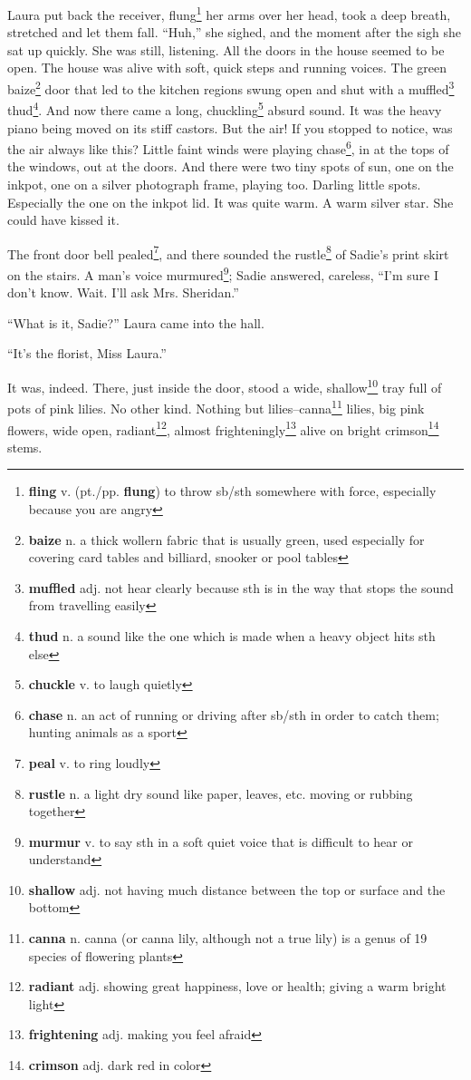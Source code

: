 Laura put back the receiver, flung\footnote{\textbf{fling} v. (pt./pp. \textbf{flung}) to throw sb/sth somewhere with force, especially because you are angry} her arms over her head, took a deep breath, stretched and let them fall. ``Huh,'' she sighed, and the moment after the sigh she sat up quickly. She was still, listening. All the doors in the house seemed to be open. The house was alive with soft, quick steps and running voices. The green baize\footnote{\textbf{baize} n. a thick wollern fabric that is usually green, used especially for covering card tables and billiard, snooker or pool tables} door that led to the kitchen regions swung open and shut with a muffled\footnote{\textbf{muffled} adj. not hear clearly because sth is in the way that stops the sound from travelling easily} thud\footnote{\textbf{thud} n. a sound like the one which is made when a heavy object hits sth else}. And now there came a long, chuckling\footnote{\textbf{chuckle} v. to laugh quietly} absurd sound. It was the heavy piano being moved on its stiff castors. But the air! If you stopped to notice, was the air always like this? Little faint winds were playing chase\footnote{\textbf{chase} n. an act of running or driving after sb/sth in order to catch them; hunting animals as a sport}, in at the tops of the windows, out at the doors. And there were two tiny spots of sun, one on the inkpot, one on a silver photograph frame, playing too. Darling little spots. Especially the one on the inkpot lid. It was quite warm. A warm silver star. She could have kissed it.

The front door bell pealed\footnote{\textbf{peal} v. to ring loudly}, and there sounded the rustle\footnote{\textbf{rustle} n. a light dry sound like paper, leaves, etc. moving or rubbing together} of Sadie's print skirt on the stairs. A man's voice murmured\footnote{\textbf{murmur} v. to say sth in a soft quiet voice that is difficult to hear or understand}; Sadie answered, careless, ``I'm sure I don't know. Wait. I'll ask Mrs. Sheridan.''

``What is it, Sadie?'' Laura came into the hall.

``It's the florist, Miss Laura.''

It was, indeed. There, just inside the door, stood a wide, shallow\footnote{\textbf{shallow} adj. not having much distance between the top or surface and the bottom} tray full of pots of pink lilies. No other kind. Nothing but lilies--canna\footnote{\textbf{canna} n. canna (or canna lily, although not a true lily) is a genus of 19 species of flowering plants} lilies, big pink flowers, wide open, radiant\footnote{\textbf{radiant} adj. showing great happiness, love or health; giving a warm bright light}, almost frighteningly\footnote{\textbf{frightening} adj. making you feel afraid} alive on bright crimson\footnote{\textbf{crimson} adj. dark red in color} stems.

